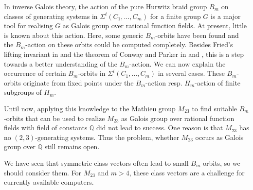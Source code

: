 \documentclass[12pt,a4paper]{article}
\numberwithin{equation}{section}
\numberwithin{table}{section}
\begin{document}
In inverse Galois theory, the action of the pure Hurwitz braid group $B_m$ on classes of generating systems
in $\Sigma^i(C_1,\dots, C_m)$ for a finite group $G$ is a major tool for realising $G$ as Galois group
over rational function fields.
At present, little is known about this action. Here, some generic $B_m$-orbits have been found and the $B_m$-action
on these orbits could be computed completely. Besides Fried's lifting invariant in \cite{RefFri2010} and
the theorem of Conway and Parker in \cite[III, Theorem 6.10]{RefMM2018} and \cite[Corollary 6.11]{RefMM2018},
this is a step towards a better understanding of the $B_m$-action. We can now explain the occurrence of 
certain $B_m$-orbits in $\Sigma^i(C_1,\dots, C_m)$ in several cases. These $B_m$-orbits originate from
fixed points under the $B_m$-action resp. $H_m$-action of finite subgroups of $H_m$.
\par
\noindent
Until now, applying this knowledge to the Mathieu group $M_{23}$ to find suitable $B_m$-orbits
that can be used to realize $M_{23}$ as Galois group over rational function fields with field of constants $\mathbb{Q}$
did not lead to success. One reason is that $M_{23}$ has no $(2,3)$-generating systems.
Thus the problem, whether $M_{23}$ occurs as Galois group over $\mathbb{Q}$ still remains open.
\par
\noindent
We have seen that symmetric class vectors often lead to small $B_m$-orbits, so we should consider them.
For $M_{23}$ and $m>4$, these class vectors are a challenge for currently available computers.
\end{document}
